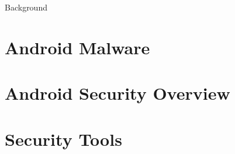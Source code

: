 Background

\section{Android Malware}
\label{sec:android_malware}

\section{Android Security Overview}
\label{sec:android_security}

\section{Security Tools}
\label{sec:security_tools}
